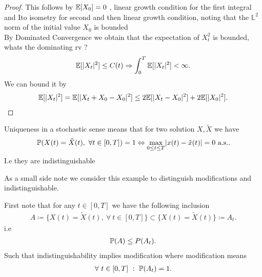 \begin{proof}
   This follows by $\E[X_{0}] = 0$ , linear growth condition for the first integral and Ito isometry for second and then linear growth condition, noting 
   that the $\mathbb{L}^2$ norm of the initial value $X_0$ is bounded \\[1ex]
    By Dominated Convergence we obtain that the expectation of $X_t^2$  is bounded, whats the dominating rv ? 
    \begin{align*}
      \E[\abs{X_t}^2] \le  C(t) \implies \int_0^{T} \E[\abs{X_t}^2]  < \infty
    .\end{align*}
    We can bound it by 
    \begin{align*}
      \E[\abs{X_t}^2] = \E[\abs{X_t + X_0 -X_0}^2] \le  2\E[\abs{X_t - X_0}^2] + 2\E[\abs{X_0}^2]
    .\end{align*}
\end{proof}
\begin{remark}
 Uniqueness in a stochastic sense means that for two solution $X,\tilde{X} $ we have
 \begin{align*}
   \P(X(t) = \tilde{X}(t), \ \forall  t \in  [0,T] ) = 1 \Leftrightarrow \max_{0\le t \le T} \abs{x(t)-\tilde{x}(t) }  = 0 \text{ a.s.}
 .\end{align*}
 I.e they are indistinguishable 
\end{remark}
As a small side note we consider this example to distinguish modifications and indistinguishable.
\begin{example}
  First note that for any $t \in  [0,T]$  we have the following inclusion 
  \begin{align*}
    A \coloneqq \{X(t)=\tilde{X}(t) ,\ \forall \ t \in  [0,T] \}  \subset  \{X(t) = \tilde{X}(t) \} \coloneqq  A_t   
  .\end{align*}
  i.e 
  \begin{align*}
   \P(A) \le  P(A_t) 
  .\end{align*}
  Such that indistinguishability implies modification where modification means 
  \begin{align*}
    \forall \ t  \in  [0,T] \ : \ \P(A_t) = 1
  .\end{align*}
\end{example}
